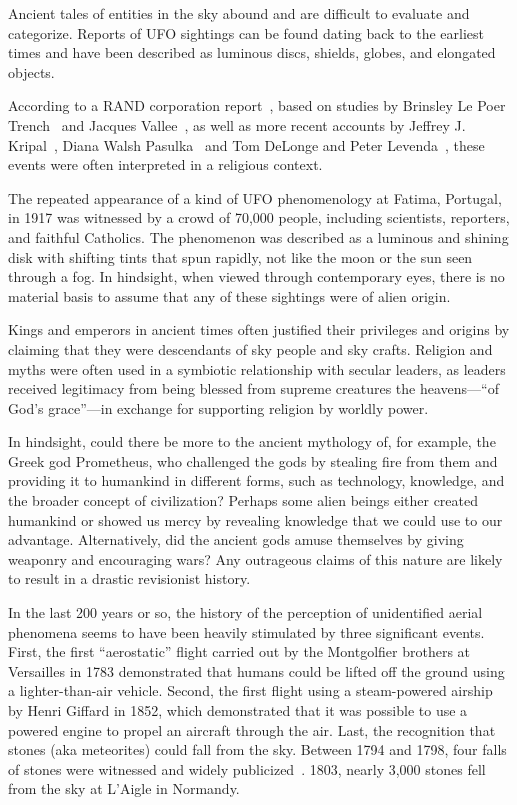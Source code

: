 Ancient tales of entities in the sky abound and are difficult to evaluate and categorize.
Reports of UFO sightings can be found dating back to the earliest times and have been described as luminous discs, shields, globes, and elongated objects.

According to a RAND corporation report~\cite{Kocher-RAND-1968Jan},
based on studies by Brinsley Le Poer Trench~\cite{lePoerTrench1961Jan} and Jacques Vallee~\cite{Vallee1965Jan},
as well as more recent accounts by Jeffrey J. Kripal~\cite{Kripal2011Nov}, Diana Walsh Pasulka~\cite{Pasulka2019Feb}
and Tom DeLonge and Peter Levenda~\cite{DeLongeLevenda-Gods,DeLongeLevenda-Men}, these events were often interpreted in a religious context.

The repeated appearance of a kind of UFO phenomenology at Fatima, Portugal, in 1917 was witnessed by a crowd of 70,000 people,
including scientists, reporters, and faithful Catholics.
The phenomenon was described as a luminous and shining disk with shifting tints that spun rapidly,
not like the moon or the sun seen through a fog.
In hindsight, when viewed through contemporary eyes, there is no material basis to assume that any of these sightings were of alien origin.

Kings and emperors in ancient times often justified their privileges and origins by claiming that they were descendants of sky people and sky crafts.
Religion and myths were often used in a symbiotic relationship with secular leaders,
as leaders received legitimacy from being blessed from supreme creatures the heavens---``of God's grace''---in
exchange for supporting religion by worldly power.

In hindsight, could there be more to the ancient mythology of, for example, the Greek god Prometheus, who challenged the gods by stealing fire from them and providing it to humankind in different forms, such as technology, knowledge, and the broader concept of civilization? Perhaps some alien beings either created humankind or showed us mercy by revealing knowledge that we could use to our advantage. Alternatively, did the ancient gods amuse themselves by giving weaponry and encouraging wars?
Any outrageous claims of this nature are likely to result in a drastic revisionist history.


In the last 200 years or so, the history of the perception of unidentified aerial
phenomena seems to have been heavily stimulated by three significant events.
First, the first ``aerostatic'' flight carried out by the Montgolfier brothers at Versailles in 1783
demonstrated that humans could be lifted off the ground using a lighter-than-air vehicle.
Second, the first flight using a steam-powered airship by Henri Giffard in 1852,
which demonstrated that it was possible to use a powered engine to propel an aircraft through the air.
Last, the recognition that stones (aka meteorites) could fall from the sky.
Between 1794 and 1798, four falls of stones were witnessed and widely publicized~\cite{Marvin_1996}. 1803, nearly 3,000 stones fell from the sky at L'Aigle in Normandy.

